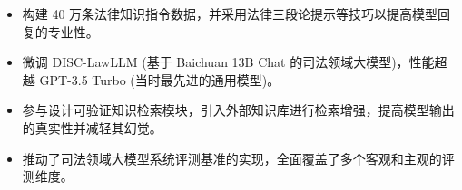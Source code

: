 


\begin{itemize}[nosep]
  \item 构建 40 万条法律知识指令数据，并采用法律三段论提示等技巧以提高模型回复的专业性。
  \item 微调 DISC-LawLLM (基于 Baichuan 13B Chat 的司法领域大模型)，性能超越 GPT-3.5 Turbo (当时最先进的通用模型)。
  \item 参与设计可验证知识检索模块，引入外部知识库进行检索增强，提高模型输出的真实性并减轻其幻觉。
  \item 推动了司法领域大模型系统评测基准的实现，全面覆盖了多个客观和主观的评测维度。
\end{itemize}
